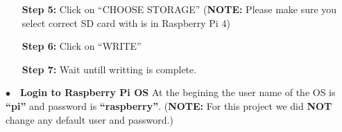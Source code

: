 \begin{itemize}[leftmargin=1.7cm]
\begin{minipage}{\textwidth}
					\vspace{2mm}
				\end{minipage}
			\item[\textbf{Step 5:}] Click on ``CHOOSE STORAGE'' (\textbf{NOTE:} Please make sure you select correct SD card with is in Raspberry Pi 4)
			\item[\textbf{Step 6:}] Click on ``WRITE''
			\item[\textbf{Step 7:}] Wait untill writting is complete.
		\end{itemize}
	
\noindent$\bullet$~~\textbf{Login to Raspberry Pi OS}
		At the begining  the user name of the OS is \textbf{``pi''} and password is \textbf{``raspberry''}. (\textbf{NOTE:} For this project we did \textbf{NOT} change any default user and password.)
	
